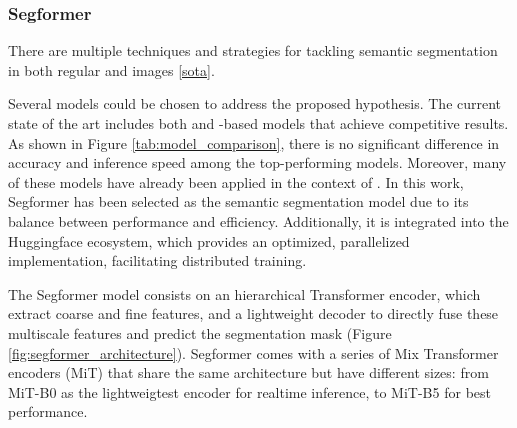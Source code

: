 \subsubsection{Segformer}
There are multiple techniques and strategies for tackling semantic segmentation in both regular and  images \ref{sota}.  

Several models could be chosen to address the proposed hypothesis. The current state of the art includes both  and -based models that achieve competitive results. As shown in Figure \ref{tab:model_comparison}, there is no significant difference in accuracy and inference speed among the top-performing models. Moreover, many of these models have already been applied in the context of . In this work, Segformer \cite{segformer} has been selected as the semantic segmentation model due to its balance between performance and efficiency. Additionally, it is integrated into the Huggingface \cite{huggingface} ecosystem, which provides an optimized, parallelized implementation, facilitating distributed training.  

\begin{table}[h]
    \centering
    \caption{Comparison of different models. Results are obtained from \cite{DDRNet} \cite{PIDNet} \cite{segformer}.  }
    \label{tab:model_comparison}
\end{table}


The Segformer model consists on an hierarchical Transformer  encoder, which extract coarse and fine features, and a lightweight  decoder to directly fuse these multiscale features and predict the segmentation mask (Figure \ref{fig:segformer_architecture}). Segformer comes with a series of Mix Transformer encoders (MiT) that share the same architecture but have different sizes: from MiT-B0 as the lightweigtest encoder for realtime inference, to MiT-B5 for best performance.

